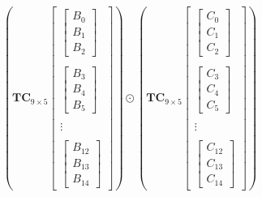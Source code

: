 \documentclass[
11pt,notheorems,hyperref={pdfauthor=whatever}
]{beamer}
\begin{document}
\begin{frame}
    \[
    \left(\mathbf{TC}_{9\times 5}
        \begin{bmatrix}
            \begin{bmatrix}
                B_{0} \\ B_{1} \\ B_{2} 
            \end{bmatrix} \\ \\
            \begin{bmatrix}
                B_{3} \\ B_{4} \\ B_{5}
            \end{bmatrix} \\ \\
            \vdots \\\\
            \begin{bmatrix}
                B_{12} \\ B_{13} \\ B_{14}
            \end{bmatrix}
        \end{bmatrix}\right)
        \odot
    \left(\mathbf{TC}_{9\times 5}
    \begin{bmatrix}
        \begin{bmatrix}
            C_{0} \\ C_{1} \\ C_{2} 
        \end{bmatrix} \\ \\
        \begin{bmatrix}
            C_{3} \\ C_{4} \\ C_{5}
        \end{bmatrix} \\ \\
        \vdots \\\\
        \begin{bmatrix}
            C_{12} \\ C_{13} \\ C_{14}
        \end{bmatrix}
    \end{bmatrix}\right)
    \]
\end{frame}
\end{document}
